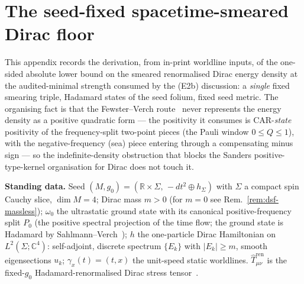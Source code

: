 %

\renewcommand{\thesection}{E2aD}%
\section{The seed-fixed spacetime-smeared Dirac floor}
\label{app:dirac-seed-floor}

This appendix records the derivation, from in-print worldline inputs,
of the one-sided absolute lower bound on the smeared renormalised
Dirac energy density at the audited-minimal strength consumed by the
(E2b) discussion: a \emph{single} fixed smearing triple, Hadamard
states of the seed folium, fixed seed metric. The organising fact is
that the Fewster--Verch route~\cite{FewsterVerch2001} never
represents the energy density as a positive quadratic form --- the
positivity it consumes is CAR-\emph{state} positivity of the
frequency-split two-point pieces (the Pauli window $0\le Q\le 1$),
with the negative-frequency (sea) piece entering through a
compensating minus sign --- so the indefinite-density obstruction
that blocks the Sanders positive-type-kernel organisation for Dirac
does not touch it.

\medskip\noindent\textbf{Standing data.} Seed
$(M,g_0)=(\mathbb R\times\Sigma,\,-dt^{2}\oplus h_\Sigma)$ with
$\Sigma$ a compact spin Cauchy slice, $\dim M=4$; Dirac mass $m>0$
(for $m=0$ see Rem.~\ref{rem:dsf-massless}); $\omega_0$ the
ultrastatic ground state with its canonical positive-frequency split
$P_0$ (the positive spectral projection of the time flow; the ground
state is Hadamard by Sahlmann--Verch~\cite{SahlmannVerch2000});
$h$ the one-particle Dirac Hamiltonian on $L^{2}(\Sigma;\mathbb C^4)$:
self-adjoint, discrete spectrum $\{E_k\}$ with $|E_k|\ge m$, smooth
eigensections $u_k$; $\gamma_x(t)=(t,x)$ the unit-speed static
worldlines. $\widehat T^{\mathrm{ren}}_{\mu\nu}$ is the fixed-$g_0$
Hadamard-renormalised Dirac stress
tensor~\cite{DappiaggiHackPinamonti2009}.

